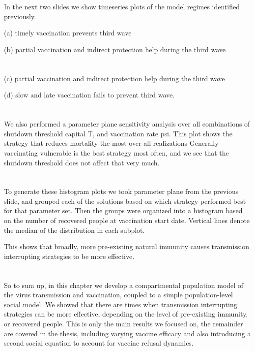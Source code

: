 \documentclass{article}
\begin{document}
\section{}

In the next two slides we show timeseries plots of the model regimes identified previously.


(a) timely vaccination prevents third wave

(b) partial vaccination and indirect protection help during the third wave

\section[Slide]{}

(c) partial vaccination and indirect protection help during the third wave

(d) slow and late vaccination fails to prevent third wave.

\section{}

We also performed a parameter plane sensitivity analysis over all combinations of shutdown threshold capital T, and vaccination rate psi. This plot shows the strategy that reduces mortality the most over all realizations Generally vaccinating vulnerable is the best strategy most often, and we see that the shutdown threshold does not affect that very much. 

\section{}

To generate these histogram plots we took parameter plane from the previous slide, and grouped each of the solutions based on which strategy performed best for that parameter set. Then the groups were organized into a histogram based on the number of recovered people at vaccination start date. Vertical lines denote the median of the distribution in each subplot.

This shows that broadly, more pre-existing natural immunity causes transmission interrupting strategies to be more effective.

\section{}

So to sum up, in this chapter we develop a compartmental population model of the virus transmission and vaccination, coupled to a simple population-level social model. We showed that there are times when transmission interrupting strategies can be more effective, depending on the level of pre-existing immunity, or recovered people. This is only the main results we focused on, the remainder are covered in the thesis, including varying vaccine efficacy and also introducing a second social equation to account for vaccine refusal dynamics.
\end{document}
